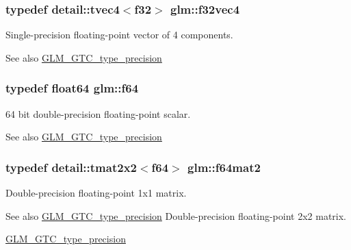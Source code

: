 \subsubsection[{f32vec4}]{\setlength{\rightskip}{0pt plus 5cm}typedef detail\+::tvec4$<$f32$>$ {\bf glm\+::f32vec4}}\label{group__gtc__type__precision_ga87b80bb1fb0fba6433912ab9aec05f2c}
Single-\/precision floating-\/point vector of 4 components. \begin{DoxySeeAlso}{See also}
\hyperlink{group__gtc__type__precision}{G\+L\+M\+\_\+\+G\+T\+C\+\_\+type\+\_\+precision} 
\end{DoxySeeAlso}
\hypertarget{group__gtc__type__precision_ga2bba392e555124b36cde6abba349bab3}{}
\subsubsection[{f64}]{\setlength{\rightskip}{0pt plus 5cm}typedef float64 {\bf glm\+::f64}}\label{group__gtc__type__precision_ga2bba392e555124b36cde6abba349bab3}
64 bit double-\/precision floating-\/point scalar. \begin{DoxySeeAlso}{See also}
\hyperlink{group__gtc__type__precision}{G\+L\+M\+\_\+\+G\+T\+C\+\_\+type\+\_\+precision} 
\end{DoxySeeAlso}
\hypertarget{group__gtc__type__precision_ga9df0911951345cd94f86e7d3895e6941}{}
\subsubsection[{f64mat2}]{\setlength{\rightskip}{0pt plus 5cm}typedef detail\+::tmat2x2$<$f64$>$ {\bf glm\+::f64mat2}}\label{group__gtc__type__precision_ga9df0911951345cd94f86e7d3895e6941}
Double-\/precision floating-\/point 1x1 matrix. \begin{DoxySeeAlso}{See also}
\hyperlink{group__gtc__type__precision}{G\+L\+M\+\_\+\+G\+T\+C\+\_\+type\+\_\+precision} Double-\/precision floating-\/point 2x2 matrix. 

\hyperlink{group__gtc__type__precision}{G\+L\+M\+\_\+\+G\+T\+C\+\_\+type\+\_\+precision} 
\end{DoxySeeAlso}
\hypertarget{group__gtc__type__precision_ga5d1ccf7df0dedda7f0c0dd791abf3fd0}{}
